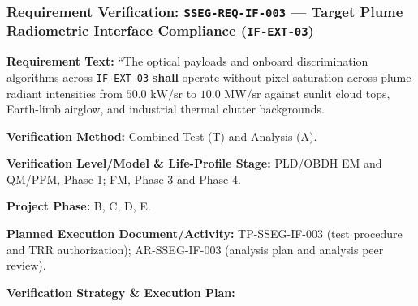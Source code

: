 \subsubsection{Requirement Verification: \texttt{SSEG-REQ-IF-003} --- Target Plume Radiometric Interface Compliance (\texttt{IF-EXT-03})}
\label{ver:SSEG-REQ-IF-003}
\textbf{Requirement Text:} ``The  optical payloads and onboard discrimination algorithms across \texttt{IF-EXT-03} \textbf{shall} operate without pixel saturation across plume radiant intensities from $50.0\text{ kW/sr}$ to $10.0\text{ MW/sr}$ against sunlit cloud tops, Earth-limb airglow, and industrial thermal clutter backgrounds.
\par\textbf{Verification Method:} Combined Test (T) and Analysis (A).
\par\textbf{Verification Level/Model \& Life-Profile Stage:} PLD/OBDH EM and QM/PFM, Phase 1; FM, Phase 3 and Phase 4.
\par\textbf{Project Phase:} B, C, D, E.
\par\textbf{Planned Execution Document/Activity:} TP-SSEG-IF-003 (test procedure and TRR authorization); AR-SSEG-IF-003 (analysis plan and analysis peer review).
\par\textbf{Verification Strategy \& Execution Plan:}
